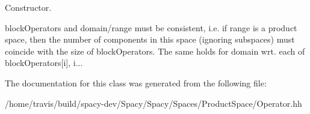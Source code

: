 Constructor. 

block\-Operators and domain/range must be consistent, i.\-e. if range is a product space, then the number of components in this space (ignoring subspaces) must coincide with the size of block\-Operators. The same holds for domain wrt. each of block\-Operators\mbox{[}i\mbox{]}, i... 

The documentation for this class was generated from the following file\-:\begin{DoxyCompactItemize}
\item 
/home/travis/build/spacy-\/dev/\-Spacy/\-Spacy/\-Spaces/\-Product\-Space/Operator.\-hh\end{DoxyCompactItemize}
